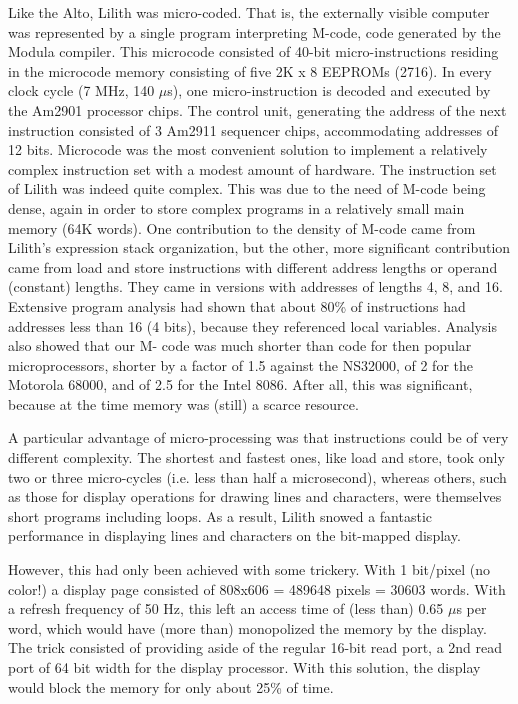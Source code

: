 Like the Alto, Lilith was micro-coded. That is, the externally visible computer was
represented by a single program interpreting M-code, code generated by the
Modula compiler. This microcode consisted of 40-bit micro-instructions residing in
the microcode memory consisting of five 2K x 8 EEPROMs (2716). In every clock
cycle (7 MHz, 140 $\mu$s), one micro-instruction is decoded and executed by the
Am2901 processor chips. The control unit, generating the address of the next
instruction consisted of 3 Am2911 sequencer chips, accommodating addresses of
12 bits. Microcode was the most convenient solution to implement a relatively
complex instruction set with a modest amount of hardware. The instruction set of
Lilith was indeed quite complex. This was due to the need of M-code being dense,
again in order to store complex programs in a relatively small main memory (64K
words). One contribution to the density of M-code came from Lilith's expression
stack organization, but the other, more significant contribution came from load and
store instructions with different address lengths or operand (constant) lengths.
They came in versions with addresses of lengths 4, 8, and 16. Extensive program
analysis had shown that about 80\% of instructions had addresses less than 16 (4
bits), because they referenced local variables. Analysis also showed that our M-
code was much shorter than code for then popular microprocessors, shorter by a
factor of 1.5 against the NS32000, of 2 for the Motorola 68000, and of 2.5 for the
Intel 8086. After all, this was significant, because at the time memory was (still) a
scarce resource.

A particular advantage of micro-processing was that instructions could be of very
different complexity. The shortest and fastest ones, like load and store, took only
two or three micro-cycles (i.e. less than half a microsecond), whereas others, such
as those for display operations for drawing lines and characters, were themselves
short programs including loops. As a result, Lilith snowed a fantastic performance
in displaying lines and characters on the bit-mapped display.

However, this had only been achieved with some trickery. With 1 bit/pixel (no
color!) a display page consisted of 808x606 = 489648 pixels = 30603 words. With
a refresh frequency of 50 Hz, this left an access time of (less than) 0.65 $\mu$s per
word, which would have (more than) monopolized the memory by the display. The
trick consisted of providing aside of the regular 16-bit read port, a 2nd read port
of 64 bit width for the display processor. With this solution, the display would block
the memory for only about 25\% of time.
